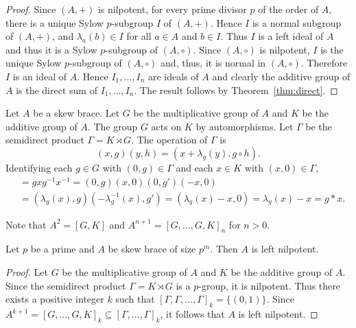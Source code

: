 \begin{proof}
Since $(A,+)$ is nilpotent, for every prime divisor $p$ of the order
of $A$, there is a unique Sylow $p$-subgroup $I$ of $(A,+)$. Hence $I$
is a normal subgroup of $(A,+)$, and $\lambda_a(b)\in I$ for all
$a\in A$ and $b\in I$. Thus $I$ is a left ideal of $A$ and thus it
is a Sylow $p$-subgroup of $(A,\circ)$. Since $(A,\circ)$ is
nilpotent, $I$ is the unique Sylow $p$-subgroup of $(A,\circ)$ and,
thus, it is normal in $(A,\circ)$. Therefore $I$ is an ideal of $A$.
Hence $I_1,\dots ,I_n$ are ideals of $A$ and clearly the additive
group of $A$ is the direct sum of $I_1,\dots ,I_n$. The result
follows by Theorem~\ref{thm:direct}.
\end{proof}


Let $A$ be a skew brace.  Let $G$ be the multiplicative group
of $A$ and $K$ be the additive group of $A$. The group $G$ acts on
$K$ by automorphisms. Let $\Gamma$ be the semidirect product
$\Gamma=K\rtimes G$. The operation of $\Gamma$ is 
\[
    (x,g)(y,h)=(x+\lambda_g(y),g\circ h).
\]
Identifying each $g\in G$ with $(0,g)\in\Gamma$ and each $x\in K$
with $(x,0)\in\Gamma$, 
\begin{align*}
[g,x]&= gxg^{-1}x^{-1}=(0,g)(x,0)(0,g')(-x,0)\\
&=(\lambda_g(x),g)(-\lambda^{-1}_g(x),g')
=(\lambda_g(x)-x,0)=\lambda_g(x)-x=g*x.
\end{align*}

Note that $A^2=[G,K]$ and $A^{n+1}=[G,\dots ,G,K]_n$ for $n>0$. 

\begin{proposition}
    \label{pro:pgroups}
    Let $p$ be a prime and $A$ be skew brace of size $p^m$. Then $A$ is
    left nilpotent.
\end{proposition}

\begin{proof}
    Let $G$ be the multiplicative group of $A$ and $K$ be the additive group of
    $A$. Since the semidirect product $\Gamma=K\rtimes G$ is a $p$-group, it is
    nilpotent. Thus there exists a positive integer $k$ such that 
    $[\Gamma,\Gamma,\dots,\Gamma]_k=\{ (0,1)\}$. Since
    $A^{k+1}=[G,\dots,G,K]_{k}\subseteq [\Gamma,\dots,\Gamma]_k$, 
    it follows that $A$ is left nilpotent.
\end{proof}


